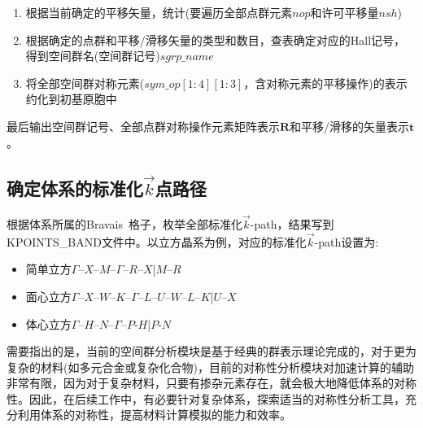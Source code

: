 \begin{enumerate}
	\item 根据当前确定的平移矢量，统计(要遍历全部点群元素$\mathit{nop}$和许可平移量$\mathit{nsh}$)
	\item 根据确定的点群和平移/滑移矢量的类型和数目，查表确定对应的\textrm{Hall}记号，得到空间群名(空间群记号)$\mathit{sgrp\_name}$
	\item 将全部空间群对称元素($\mathit{sym\_op}[1:4][1:3]$，含对称元素的平移操作)的表示约化到初基原胞中
\end{enumerate}
最后输出空间群记号、全部点群对称操作元素矩阵表示$\mathbf{R}$和平移/滑移的矢量表示$\mathbf{t}$。

\subsection{确定体系的标准化$\vec k$点路径}
根据体系所属的\textrm{Bravais~}格子，枚举全部标准化$\vec k$-\textrm{path}，结果写到\textrm{KPOINTS\_BAND}文件中。以立方晶系为例，对应的标准化$\vec k$-\textrm{path}设置为:~
\begin{itemize}
	\item 简单立方\quad $\Gamma$–$X$–$M$–$\Gamma$–$R$–$X$|$M$–$R$
	\item 面心立方\quad $\Gamma$–$X$–$W$–$K$–$\Gamma$–$L$–$U$–$W$–$L$–$K$|$U$–$X$
	\item 体心立方\quad $\Gamma$–$H$–$N$–$\Gamma$–$P$-$H$|$P$-$N$
\end{itemize}

需要指出的是，当前的空间群分析模块是基于经典的群表示理论完成的，对于更为复杂的材料(如多元合金或复杂化合物)，目前的对称性分析模块对加速计算的辅助非常有限，因为对于复杂材料，只要有掺杂元素存在，就会极大地降低体系的对称性。因此，在后续工作中，有必要针对复杂体系，探索适当的对称性分析工具，充分利用体系的对称性，提高材料计算模拟的能力和效率。
